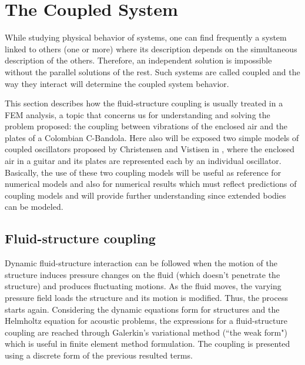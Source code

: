 \section{The Coupled System}

While studying physical behavior of systems, one can find frequently a system linked to others (one or more) where its description depends on the simultaneous description of the others. Therefore, an independent solution is impossible without the parallel solutions of the rest. Such systems are called coupled and the way they interact will determine the coupled system behavior.

This section describes how the fluid-structure coupling is usually treated in a FEM analysis, a topic that concerns us for understanding and solving the problem proposed: the coupling between vibrations of the enclosed air and the plates of a Colombian C-Bandola. Here also will be exposed two simple models of coupled oscillators proposed by Christensen and Vistisen in \cite{Christensen, Christensen3}, where the enclosed air in a guitar and its plates are represented each by an individual oscillator. Basically, the use of these two coupling models will be useful as reference for numerical models and also for numerical results which must reflect predictions of coupling models and will provide further understanding since extended bodies can be modeled.

\subsection{Fluid-structure coupling}

Dynamic fluid-structure interaction can be followed when the motion of the structure induces pressure changes on the fluid (which doesn't penetrate the structure) and produces fluctuating motions. As the fluid moves, the varying pressure field loads the structure and its motion is modified. Thus, the process starts again. Considering the dynamic equations form for structures and the Helmholtz equation for acoustic problems, the expressions for a fluid-structure coupling are reached through Galerkin's variational method (``the weak form") which is useful in finite element method formulation. The coupling is presented using a discrete form of the previous resulted terms.

